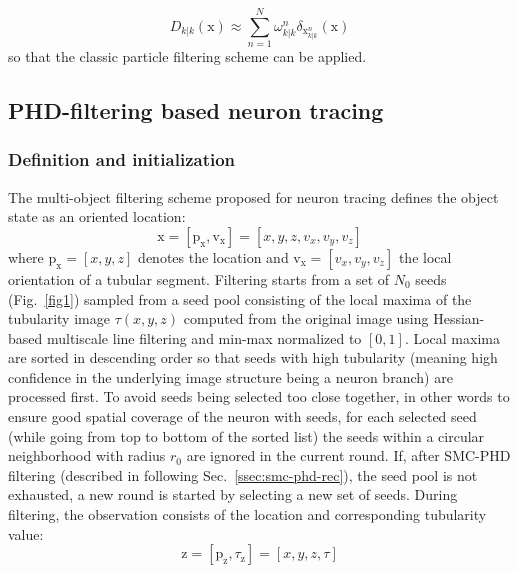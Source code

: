\begin{equation}
\label{eq:smc-approx}
D_{k|k}(\mathrm{x}) \approx \sum\limits_{n=1}^{N} \omega_{k|k}^{n} \delta_{\mathrm{x}_{k|k}^{n}}\!(\mathrm{x})
\end{equation}
so that the classic particle filtering scheme \cite{doucet2000sequential, arulampalam2002tutorial, ristic2004beyond} can be applied.

\subsection{PHD-filtering based neuron tracing}
\label{ssec:proposed-neur-trac-meth}
\subsubsection{Definition and initialization}
\label{sssec:initialization}
The multi-object filtering scheme proposed for neuron tracing defines the object state as an oriented location:
\begin{equation}
\mathrm{x} = \left[ \mathrm{p}_{\mathrm{x}}, \mathrm{v}_{\mathrm{x}} \right] = \left[x, y, z, v_x, v_y, v_z\right] 
\label{eq:obj-state}
\end{equation}
where $\mathrm{p}_{\mathrm{x}}=[x, y, z]$ denotes the location and $\mathrm{v}_{\mathrm{x}}=[v_x, v_y, v_z]$ the local orientation of a tubular segment. Filtering starts from a set of $N_0$ seeds (Fig.~\ref{fig1}) sampled from a seed pool consisting of the local maxima of the tubularity image $\tau(x,y,z)$ computed from the original image using Hessian-based multiscale line filtering \cite{sato1998three} and min-max normalized to $[0,1]$. Local maxima are sorted in descending order so that seeds with high tubularity (meaning high confidence in the underlying image structure being a neuron branch) are processed first. To avoid seeds being selected too close together, in other words to ensure good spatial coverage of the neuron with seeds, for each selected seed (while going from top to bottom of the sorted list) the seeds within a circular neighborhood with radius $r_0$ are ignored in the current round. If, after SMC-PHD filtering (described in following Sec.~\ref{ssec:smc-phd-rec}), the seed pool is not exhausted, a new round is started by selecting a new set of seeds. During filtering, the observation consists of the location and corresponding tubularity value:
\begin{equation}
\mathrm{z} = \left[ \mathrm{p}_{\mathrm{z}}, \tau_{\mathrm{z}} \right] = \left[x, y, z, \tau\right]
\label{eq:observation}
\end{equation}

